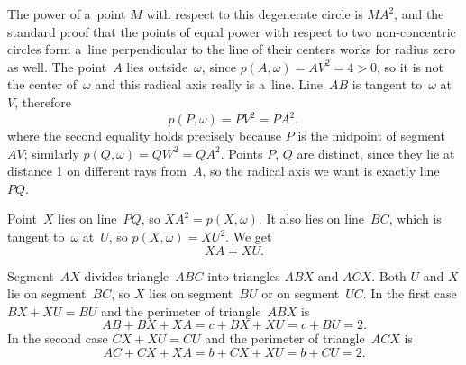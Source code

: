 {    The power of a~point $M$ with respect to this degenerate circle is $MA^2$, and the standard proof that the points of equal power with respect to two non-concentric circles form a~line perpendicular to the line of their centers works for radius zero as well. The point~$A$ lies outside~$\omega$, since $p(A,\omega) = AV^2 = 4 > 0$, so it is not the center of~$\omega$ and this radical axis really is a~line. Line~$AB$ is tangent to~$\omega$ at~$V$, therefore
    $$
    p(P,\omega) = PV^2 = PA^2,
    $$
    where the second equality holds precisely because $P$ is the midpoint of segment~$AV$; similarly $p(Q,\omega) = QW^2 = QA^2$. Points $P$, $Q$ are distinct, since they lie at distance 1 on different rays from~$A$, so the radical axis we want is exactly line~$PQ$.

    Point~$X$ lies on line~$PQ$, so $XA^2 = p(X,\omega)$. It also lies on line~$BC$, which is tangent to~$\omega$ at~$U$, so $p(X,\omega) = XU^2$. We get
    $$
    XA = XU.
    $$

    Segment~$AX$ divides triangle~$ABC$ into triangles $ABX$ and $ACX$. Both $U$ and $X$ lie on segment~$BC$, so $X$ lies on segment~$BU$ or on segment~$UC$. In the first case $BX + XU = BU$ and the perimeter of triangle~$ABX$ is
    $$
    AB + BX + XA = c + BX + XU = c + BU = 2.
    $$
    In the second case $CX + XU = CU$ and the perimeter of triangle~$ACX$ is
    $$
    AC + CX + XA = b + CX + XU = b + CU = 2.
    $$
}


